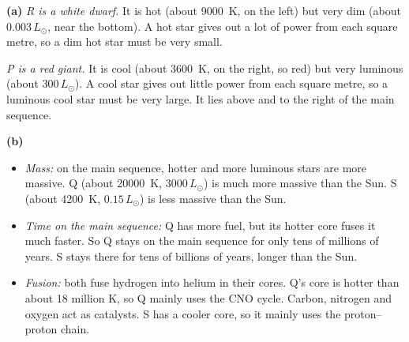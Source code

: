 \begin{practiceanswers}
\enlargethispage{\baselineskip}
\begin{practiceans}
  \begin{modelanswer}
  \textbf{(a)} \emph{R is a white dwarf.} It is hot (about \qty{9000}{K}, on the left) but
  very dim (about $0.003\,L_\odot$, near the bottom). A hot star gives out a lot of power
  from each square metre, so a dim hot star must be very small.

  \emph{P is a red giant.} It is cool (about \qty{3600}{K}, on the right, so red) but very
  luminous (about $300\,L_\odot$). A cool star gives out little power from each square metre,
  so a luminous cool star must be very large. It lies above and to the right of the main
  sequence.

  \textbf{(b)}
  \begin{itemize}
    \item \emph{Mass:} on the main sequence, hotter and more luminous stars are more massive.
          Q (about \qty{20000}{K}, $3000\,L_\odot$) is much more massive than the Sun. S
          (about \qty{4200}{K}, $0.15\,L_\odot$) is less massive than the Sun.
    \item \emph{Time on the main sequence:} Q has more fuel, but its hotter core fuses it
          much faster. So Q stays on the main sequence for only tens of millions of years.
          S stays there for tens of billions of years, longer than the Sun.
    \item \emph{Fusion:} both fuse hydrogen into helium in their cores. Q's core is hotter
          than about 18 million K, so Q mainly uses the CNO cycle. Carbon, nitrogen and
          oxygen act as catalysts. S has a cooler core, so it mainly uses the proton--proton
          chain.
  \end{itemize}


\end{modelanswer}
\end{practiceans}
\end{practiceanswers}
